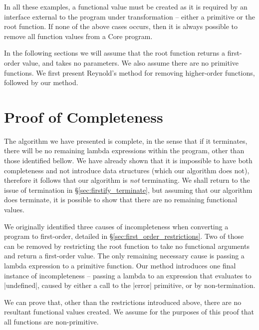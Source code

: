 \documentclass[preprint]{sigplanconf}
\begin{document}
In all these examples, a functional value must be created as it is required by an interface external to the program under transformation -- either a primitive or the root function. If none of the above cases occurs, then it is always possible to remove all function values from a Core program.

In the following sections we will assume that the root function returns a first-order value, and takes no parameters. We also assume there are no primitive functions. We first present Reynold's method for removing higher-order functions, followed by our method.

\section{Proof of Completeness}


The algorithm we have presented is complete, in the sense that if it terminates, there will be no remaining lambda expressions within the program, other than those identified bellow. We have already shown that it is impossible to have both completeness and not introduce data structures (which our algorithm does not), therefore it follows that our algorithm is \textit{not} terminating. We shall return to the issue of termination in \S\ref{sec:firstify_terminate}, but assuming that our algorithm does terminate, it is possible to show that there are no remaining functional values.

We originally identified three causes of incompleteness when converting a program to first-order, detailed in \S\ref{sec:first_order_restrictions}. Two of those can be removed by restricting the root function to take no functional arguments and return a first-order value. The only remaining necessary cause is passing a lambda expression to a primitive function. Our method introduces one final instance of incompleteness -- passing a lambda to an expression that evaluates to |undefined|, caused by either a call to the |error| primitive, or by non-termination.

We can prove that, other than the restrictions introduced above, there are no resultant functional values created. We assume for the purposes of this proof that all functions are non-primitive.
\end{document}
